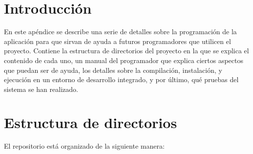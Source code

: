 
\section{Introducción}
En este apéndice se describe una serie de detalles sobre la programación de la aplicación para que sirvan de ayuda a futuros programadores que utilicen el proyecto. Contiene la estructura de directorios del proyecto en la que se explica el contenido de cada uno, un manual del programador que explica ciertos aspectos que puedan ser de ayuda, los detalles sobre la compilación, instalación, y ejecución en un entorno de desarrollo integrado, y por último, qué pruebas del sistema se han realizado.
\section{Estructura de directorios}
El repositorio está organizado de la siguiente manera:
